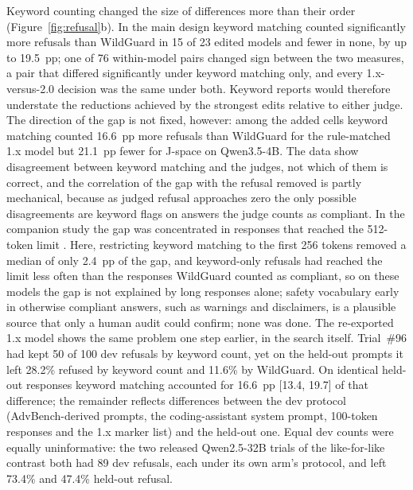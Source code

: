 Keyword counting changed the size of differences more than their order (Figure~\ref{fig:refusal}b). In the main
design keyword matching counted significantly more refusals than WildGuard in 15 of 23 edited models and fewer in
none, by up to 19.5~pp; one of 76 within-model pairs changed sign between the two measures, a pair that differed
significantly under keyword matching only, and every 1.x-versus-2.0 decision was the same under both. Keyword
reports would therefore understate the reductions achieved by the strongest edits relative to either judge. The
direction of the gap is not fixed, however: among the added cells keyword matching counted 16.6~pp more refusals
than WildGuard for the rule-matched 1.x model but 21.1~pp fewer for J-space on Qwen3.5-4B. The data show disagreement
between keyword matching and the judges, not which of them is correct, and the correlation of the gap with the
refusal removed is partly mechanical, because as judged refusal approaches zero the only possible disagreements are
keyword flags on answers the judge counts as compliant. In the companion study the gap was concentrated in responses
that reached the 512-token limit \cite{young2026harder}. Here, restricting keyword matching to the first 256 tokens
removed a median of only 2.4~pp of the gap, and keyword-only refusals had reached the limit less often than the
responses WildGuard counted as compliant, so on these models the gap is not explained by long responses alone;
safety vocabulary early in otherwise compliant answers, such as warnings and disclaimers, is a plausible source that
only a human audit could confirm; none was done. The re-exported 1.x model shows the same problem one step earlier, in the search
itself. Trial~\#96 had kept 50 of 100 dev refusals by keyword count, yet on the held-out prompts it left 28.2\%
refused by keyword count and 11.6\% by WildGuard. On identical held-out responses keyword matching accounted for
16.6~pp [13.4, 19.7] of that difference; the remainder reflects differences between the dev protocol
(AdvBench-derived prompts, the coding-assistant system prompt, 100-token responses and the 1.x marker list) and the
held-out one. Equal dev counts were equally uninformative: the two released Qwen2.5-32B trials of the like-for-like
contrast both had 89 dev refusals, each under its own arm's protocol, and left 73.4\% and 47.4\% held-out refusal.

